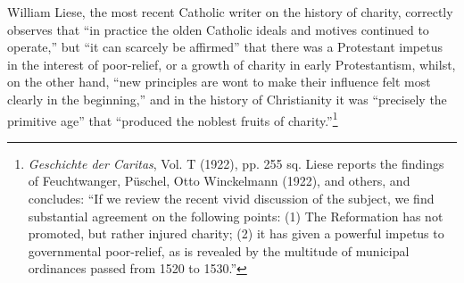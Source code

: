 William Liese, the most recent Catholic writer on the history of charity,
correctly observes that “in practice the olden Catholic ideals and motives
continued to operate,” but “it can scarcely be affirmed” that there was a
Protestant impetus in the interest of poor-relief, or a growth of charity in
early Protestantism, whilst, on the other hand, “new principles are wont to
make their influence felt most clearly in the beginning,” and in the history of
Christianity it was “precisely the primitive age” that “produced the noblest
fruits of charity.”\footnote
{\textit{Geschichte der Caritas}, Vol. T (1922), pp. 255 sq. Liese reports the findings of Feuchtwanger,
Püschel, Otto Winckelmann (1922), and others, and concludes: “If we review
the recent vivid discussion of the subject, we find substantial agreement on the following
points: (1) The Reformation has not promoted, but rather injured charity; (2) it
has given a powerful impetus to governmental poor-relief, as is revealed by the multitude
of municipal ordinances passed from 1520 to 1530.”}

